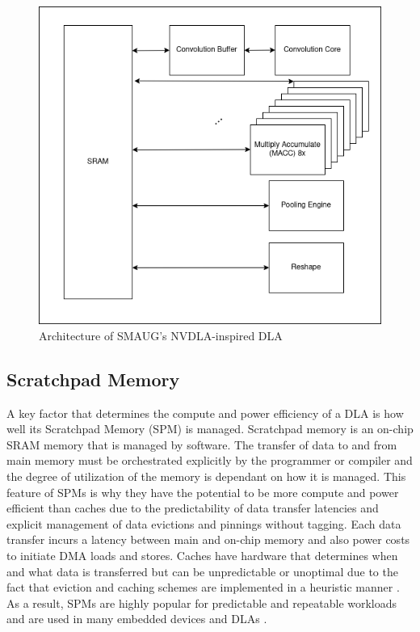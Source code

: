 \begin{figure}[thb!]
\centering
\includegraphics[scale=0.5]{Figures/nvdla.png}
\decoRule
\caption[Reduction]{Architecture of SMAUG's NVDLA-inspired DLA}
\label{fig:nvdla}
\end{figure}


\subsection{Scratchpad Memory}
A key factor that determines the compute and power efficiency of a DLA is how
well its Scratchpad Memory (SPM) is managed. Scratchpad memory is an on-chip
SRAM memory that is managed by software. The transfer of data to and from main
memory must be orchestrated explicitly by the programmer or compiler and the
degree of utilization of the memory is dependant on how it is managed.  This
feature of SPMs is why they have the potential to be more compute and power
efficient than caches due to the predictability of data transfer latencies and
explicit management of data evictions and pinnings without tagging.  Each data
transfer incurs a latency between main and on-chip memory and also power costs
to initiate DMA loads and stores. Caches have hardware that determines when and
what data is transferred but can be unpredictable or unoptimal due to the fact
that eviction and caching schemes are implemented in a heuristic manner
\cite{manyCore}. As a result, SPMs are highly popular for predictable and
repeatable workloads and are used in many embedded devices \cite{graphColoring}
and DLAs \cite{onsram}.


